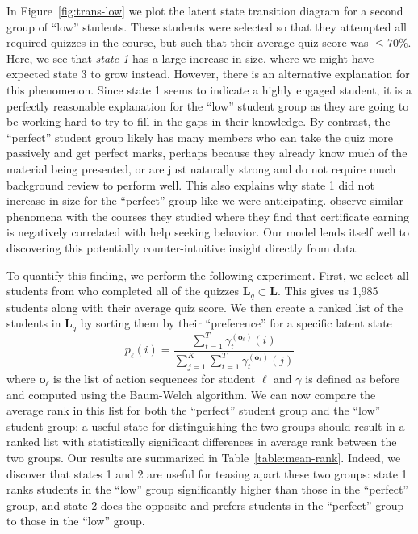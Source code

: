 In Figure~\ref{fig:trans-low} we plot the latent state transition diagram
for a second group of ``low'' students. These students were selected so
that they attempted all required quizzes in the course, but such that their
average quiz score was $\leq 70\%$. Here, we see that \emph{state 1} has a
large increase in size, where we might have expected state 3 to grow
instead.  However, there is an alternative explanation for this phenomenon.
Since state 1 seems to indicate a highly engaged student, it is a perfectly
reasonable explanation for the ``low'' student group as they are going to
be working hard to try to fill in the gaps in their knowledge. By contrast,
the ``perfect'' student group likely has many members who can take the quiz
more passively and get perfect marks, perhaps because they already know
much of the material being presented, or are just naturally strong and do
not require much background review to perform well. This also explains why
state 1 did not increase in size for the ``perfect'' group like we were
anticipating. \citet{Kizilcec:2017:CandE} observe similar phenomena with
the courses they studied where they find that certificate earning is
negatively correlated with help seeking behavior. Our model lends itself
well to discovering this potentially counter-intuitive insight directly
from data.

To quantify this finding, we perform the following experiment. First, we
select all students from \textretrieval{} who completed all of the quizzes
$\mathbf{L}_q \subset \mathbf{L}$. This gives us 1,985 students along with
their average quiz score. We then create a ranked list of the students in
$\mathbf{L}_q$ by sorting them by their ``preference'' for a specific
latent state
\begin{equation}
  p_\ell(i) = \frac{\sum_{t=1}^T \gamma_t^{(\mathbf{o}_\ell)}(i)}
  {\sum_{j=1}^{K} \sum_{t=1}^T \gamma_t^{(\mathbf{o}_\ell)}(j)}
\end{equation}
where $\mathbf{o}_\ell$ is the list of action sequences for student $\ell$
and $\gamma$ is defined as before and computed using the Baum-Welch
algorithm. We can now compare the average rank in this list for both
the ``perfect'' student group and the ``low'' student group: a useful state
for distinguishing the two groups should result in a ranked list with
statistically significant differences in average rank between the two
groups. Our results are summarized in Table~\ref{table:mean-rank}. Indeed,
we discover that states 1 and 2 are useful for teasing apart these two
groups: state 1 ranks students in the ``low'' group significantly higher
than those in the ``perfect'' group, and state 2 does the opposite and
prefers students in the ``perfect'' group to those in the ``low'' group.

